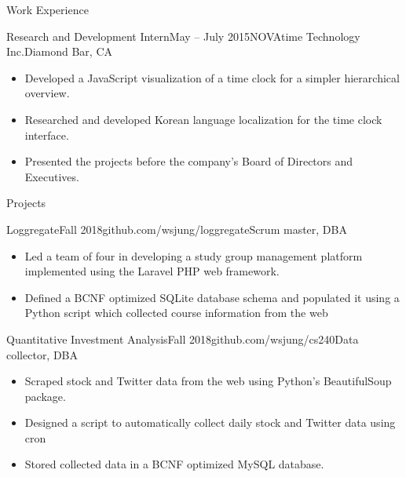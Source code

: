 \documentclass{resume} %
\begin{document}
\begin{rSection}{Work Experience}
\begin{rSubsection}{Research and Development Intern}{May -- July 2015}{NOVAtime Technology Inc.}{Diamond Bar, CA}
\renewcommand\labelitemi{$\cdot$}
\begin{itemize}
\setlength\itemsep{-0.25em}
\item Developed a JavaScript visualization of a time clock for a simpler hierarchical overview. 
\item Researched and developed Korean language localization for the time clock interface.
\item Presented the projects before the company's Board of Directors and Executives.\end{itemize}
\end{rSubsection}

\end{rSection}

\begin{rSection}{Projects}

\begin{rSubsection}{Loggregate}{Fall 2018}{github.com/wsjung/loggregate}{Scrum master, DBA}
\renewcommand\labelitemi{$\cdot$}
\begin{itemize}
\setlength\itemsep{-0.25em}
\item Led a team of four in developing a study group management platform implemented using the Laravel PHP web framework.
\item Defined a BCNF optimized SQLite database schema and populated it using a Python script which collected course information from the web
\end{itemize}
\end{rSubsection}

\begin{rSubsection}{Quantitative Investment Analysis}{Fall 2018}{github.com/wsjung/cs240}{Data collector, DBA}
\renewcommand\labelitemi{$\cdot$}
\begin{itemize}
\setlength\itemsep{-0.25em}
\item Scraped stock and Twitter data from the web using Python's BeautifulSoup package.
\item Designed a script to automatically collect daily stock and Twitter data using cron
\item Stored collected data in a BCNF optimized MySQL database.
\end{itemize}
\end{rSubsection}

\end{rSection}
\end{document}
